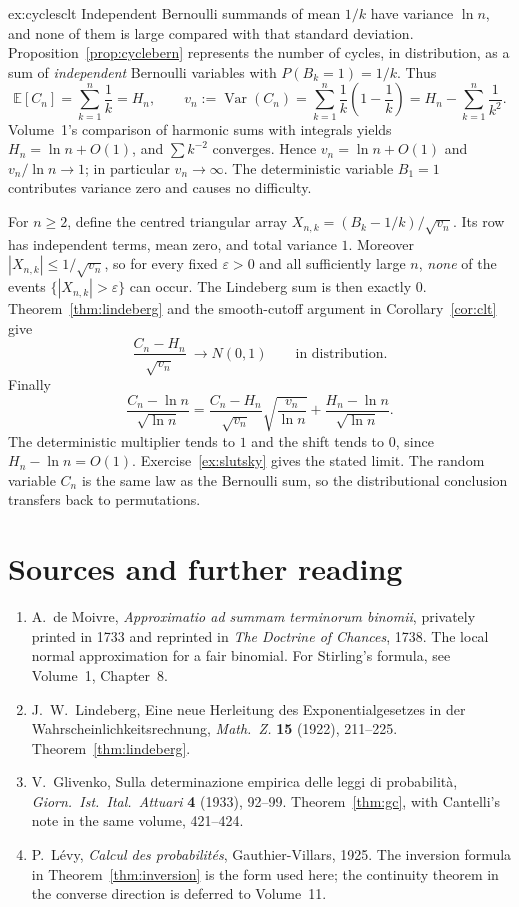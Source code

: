 \begin{solution}{ex:cyclesclt}
\idea Independent Bernoulli summands of mean $1/k$ have variance $\ln n$, and none of them is large compared with that standard deviation.
\writeup Proposition~\ref{prop:cyclebern} represents the number of cycles, in distribution, as a sum of \emph{independent} Bernoulli variables with $P(B_k=1)=1/k$. Thus
\[
 \mathbb E[C_n]=\sum_{k=1}^n\frac1k=H_n,\qquad
 v_n:=\operatorname{Var}(C_n)=\sum_{k=1}^n\frac1k\left(1-\frac1k\right)
 =H_n-\sum_{k=1}^n\frac1{k^2}.
\]
Volume~1's comparison of harmonic sums with integrals yields $H_n=\ln n+O(1)$, and $\sum k^{-2}$ converges. Hence $v_n=\ln n+O(1)$ and $v_n/\ln n\to1$; in particular $v_n\to\infty$. The deterministic variable $B_1=1$ contributes variance zero and causes no difficulty.

For $n\ge2$, define the centred triangular array $X_{n,k}=(B_k-1/k)/\sqrt{v_n}$. Its row has independent terms, mean zero, and total variance $1$. Moreover $|X_{n,k}|\le1/\sqrt{v_n}$, so for every fixed $\varepsilon>0$ and all sufficiently large $n$, \emph{none} of the events $\{|X_{n,k}|>\varepsilon\}$ can occur. The Lindeberg sum is then exactly $0$. Theorem~\ref{thm:lindeberg} and the smooth-cutoff argument in Corollary~\ref{cor:clt} give
\[
 \frac{C_n-H_n}{\sqrt{v_n}}\ \longrightarrow N(0,1)
 \qquad\text{in distribution.}
\]
Finally
\[
 \frac{C_n-\ln n}{\sqrt{\ln n}}
 =\frac{C_n-H_n}{\sqrt{v_n}}\sqrt{\frac{v_n}{\ln n}}
   +\frac{H_n-\ln n}{\sqrt{\ln n}}.
\]
The deterministic multiplier tends to $1$ and the shift tends to $0$, since $H_n-\ln n=O(1)$. Exercise~\ref{ex:slutsky} gives the stated limit. The random variable $C_n$ is the same law as the Bernoulli sum, so the distributional conclusion transfers back to permutations.
\end{solution}

\section*{Sources and further reading}

\begin{enumerate}
\item A.~de Moivre, \emph{Approximatio ad summam terminorum binomii}, privately printed in 1733 and reprinted in \emph{The Doctrine of Chances}, 1738. The local normal approximation for a fair binomial. For Stirling's formula, see Volume~1, Chapter~8.
\item J.~W.~Lindeberg, Eine neue Herleitung des Exponentialgesetzes in der Wahrscheinlichkeitsrechnung, \emph{Math.\ Z.} \textbf{15} (1922), 211--225. Theorem~\ref{thm:lindeberg}.
\item V.~Glivenko, Sulla determinazione empirica delle leggi di probabilit\`a, \emph{Giorn.\ Ist.\ Ital.\ Attuari} \textbf{4} (1933), 92--99. Theorem~\ref{thm:gc}, with Cantelli's note in the same volume, 421--424.
\item P.~L\'evy, \emph{Calcul des probabilit\'es}, Gauthier-Villars, 1925. The inversion formula in Theorem~\ref{thm:inversion} is the form used here; the continuity theorem in the converse direction is deferred to Volume~11.
\end{enumerate}

